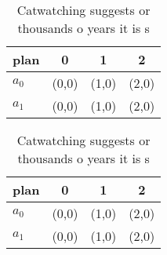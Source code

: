 \documentclass[a4paper]{article}
\begin{document}
\begin{table}
\begin{adjustbox}{width=0.6\columnwidth}
\begin{tabular}{|l|l|l|l|}
\hline
\textbf{plan} & \multicolumn{1}{c|}{\textbf{0}} & \multicolumn{1}{c|}{\textbf{1}} & \multicolumn{1}{c|}{\textbf{2}} \\ \hline
\textbf{$a_0$}  & (0,0) & (1,0) & (2,0) \\ \hline
\textbf{$a_1$}  & (0,0) & (1,0) & (2,0) \\ \hline
\end{tabular}
\end{adjustbox}
\caption{Catwatching suggests or thousands o years it is s
}
\end{table}

\begin{table}
\begin{adjustbox}{width=0.6\columnwidth}
\begin{tabular}{|l|l|l|l|}
\hline
\textbf{plan} & \multicolumn{1}{c|}{\textbf{0}} & \multicolumn{1}{c|}{\textbf{1}} & \multicolumn{1}{c|}{\textbf{2}} \\ \hline
\textbf{$a_0$}  & (0,0) & (1,0) & (2,0) \\ \hline
\textbf{$a_1$}  & (0,0) & (1,0) & (2,0) \\ \hline
\end{tabular}
\end{adjustbox}
\caption{Catwatching suggests or thousands o years it is s
}
\end{table}
\end{document}
